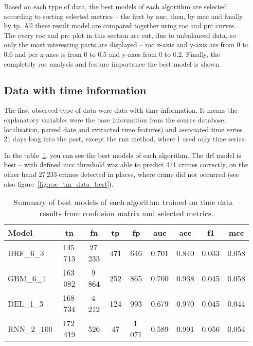 \documentclass[thesis=M,english]{FITthesis}[2012/10/20]
\begin{document}
Based on each type of data, the best models of each algorithm are selected according to sorting selected metrics -- the first by \gls{auc}, then, by \gls{mcc} and finally by \gls{tp}. All these result model are compared together using \gls{roc} and \gls{prc} curves. The every \gls{roc} and \gls{prc} plot in this section are cut, due to unbalanced data, so only the most interesting parts are displayed -- \gls{roc} x-axis and y-axis are from 0 to 0.6 and \gls{pcr} x-axes is from 0 to 0.5 and y-axes from 0 to 0.2. Finally, the completely \gls{roc} analysis and feature importance the best model is shown.

\subsection{Data with time information}\label{sec:tm_information}

The first observed type of data were data with time information. It means the explanatory variables were the base information from the source database, localisation, parsed date and extracted time features) and associated time series 21 days long into the past, except the \gls{rnn} method, where I used only time series.  

In the table~\ref{tab:tm_data_summary}, you can see the best models of each algorithm. The \gls{drf} model is best -- with defined \gls{mcc} threshold was able to predict 471 crimes correctly, on the other hand 27\,233 crimes detected in places, where crime did not occurred (see also figure~\ref{fig:roc_tm_data_best}). 

\vspace*{0.2cm}
\begin{table}[H]\centering
\begin{small}
    \caption{Summary of best models of each algorithm trained on time data -- results from confusion matrix and selected metrics.}\label{tab:tm_data_summary}
    \begin{tabular}{|l|c|c|c|c|c|c|c|c|}\hline
        Model & \gls{tn} & \gls{fn} & \gls{tp} & \gls{fp} & \gls{auc} & \gls{acc} & \gls{f1} & \gls{mcc} \tabularnewline \hline \hline
        DRF\_6\_3 & 145\,713 & 27\,233 & 471 & 646 & 0.701 & 0.840 & 0.033 & 0.058 \tabularnewline \hline
        GBM\_6\_1 & 163\,082 & 9\,864 & 252 & 865 & 0.700 & 0.938 & 0.045 & 0.058 \tabularnewline \hline
        DEL\_1\_3 & 168\,734 & 4\,212 & 124 & 993 & 0.679 & 0.970 & 0.045 & 0.044 \tabularnewline \hline
        RNN\_2\_100 & 172\,419 & 526 & 47 & 1\,071 & 0.589 & 0.991 & 0.056 & 0.054 \tabularnewline \hline
    \end{tabular}
\end{small}
\end{table}
\vspace*{0.2cm}
\end{document}
